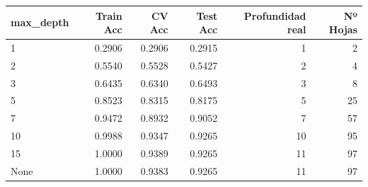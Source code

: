 \begin{tabular}{lrrrrr}
\toprule
max\_depth & Train Acc & CV Acc & Test Acc & Profundidad real & Nº Hojas \\
\midrule
1 & 0.2906 & 0.2906 & 0.2915 & 1 & 2 \\
2 & 0.5540 & 0.5528 & 0.5427 & 2 & 4 \\
3 & 0.6435 & 0.6340 & 0.6493 & 3 & 8 \\
5 & 0.8523 & 0.8315 & 0.8175 & 5 & 25 \\
7 & 0.9472 & 0.8932 & 0.9052 & 7 & 57 \\
10 & 0.9988 & 0.9347 & 0.9265 & 10 & 95 \\
15 & 1.0000 & 0.9389 & 0.9265 & 11 & 97 \\
None & 1.0000 & 0.9383 & 0.9265 & 11 & 97 \\
\bottomrule
\end{tabular}

